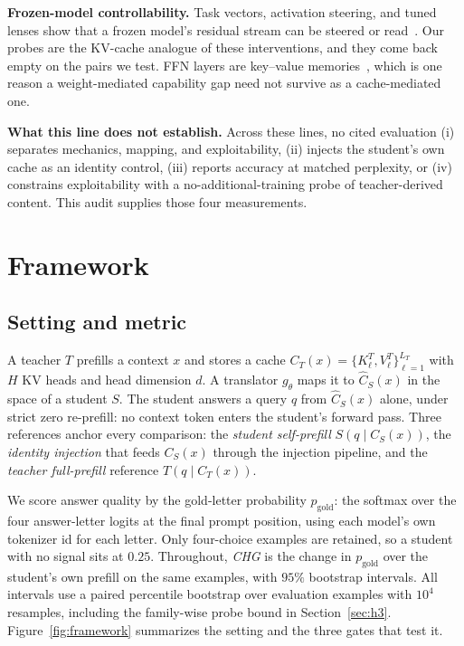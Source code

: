 \documentclass{article} %
\newcommand{\kv}{\ensuremath{\mathrm{KV}}}
\newcommand{\gold}{\ensuremath{p_{\mathrm{gold}}}}
\begin{document}
\textbf{Frozen-model controllability.} Task vectors, activation steering, and
tuned lenses show that a frozen model's residual stream can be steered or
read~\citep{taskvectors2023,actsteer2024,tunedlens2023,gist2023}. Our probes are
the \kv{}-cache analogue of these interventions, and they come back empty on the
pairs we test. FFN layers are key--value memories~\citep{ffnmemory2021}, which is
one reason a weight-mediated capability gap need not survive as a cache-mediated
one.

\textbf{What this line does not establish.} Across these lines, no cited
evaluation (i) separates mechanics, mapping, and exploitability, (ii) injects
the student's own cache as an identity control, (iii) reports accuracy at
matched perplexity, or (iv) constrains exploitability with a
no-additional-training probe of teacher-derived content. This audit supplies those four measurements.


\section{Framework}
\label{sec:framework}

\subsection{Setting and metric}
A teacher $T$ prefills a context $x$ and stores a cache
$C_T(x)=\{K^T_\ell,V^T_\ell\}_{\ell=1}^{L_T}$ with $H$ \kv{} heads and head
dimension $d$. A translator $g_\theta$ maps it to $\widehat C_S(x)$ in the space
of a student $S$. The student answers a query $q$ from
$\widehat C_S(x)$ alone, under strict zero re-prefill: no context token enters
the student's forward pass. Three references anchor every comparison: the
\emph{student self-prefill} $S(q\mid C_S(x))$, the \emph{identity injection}
that feeds $C_S(x)$ through the injection pipeline, and the \emph{teacher
full-prefill} reference $T(q\mid C_T(x))$.

We score answer quality by the gold-letter probability $\gold$: the softmax over
the four answer-letter logits at the final prompt position, using each model's
own tokenizer id for each letter. Only four-choice examples are retained, so a
student with no signal sits at $0.25$. Throughout, \emph{CHG} is the change in
$\gold$ over the student's own prefill on the same examples, with $95\%$
bootstrap intervals. All intervals use a paired percentile bootstrap over
evaluation examples with $10^4$ resamples, including the family-wise probe
bound in Section~\ref{sec:h3}. Figure~\ref{fig:framework} summarizes the
setting and the three gates that test it.
\end{document}
